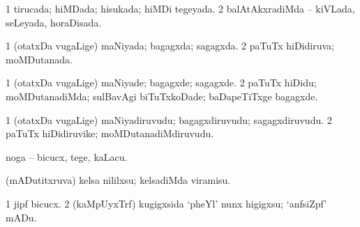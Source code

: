 {{\bentry
{} 
\gl{\gu}
\expl{}
\bmng
\bnum
\num{1} tirucada; hiMDada; hisukada; hiMDi tegeyada. 
\num{2} balAtAkxradiMda -- kiVLada, seLeyada, horaDisada. 
\enum
\emng
\eentry

\bentry
{} 
\gl{\gu}
\expl{}
\bmng
\bnum
\num{1} (otatxDa \mo vugaLige) maNiyada; bagagxda; sagagxda. 
\num{2} paTuTx hiDidiruva; moMDutanada. 
\enum
\emng
\eentry

\bentry
{} 
\gl{\kirxvi}
\expl{}
\bmng
\bnum
\num{1} (otatxDa \mo vugaLige) maNiyade; bagagxde; sagagxde. 
\num{2} paTuTx hiDidu; moMDutanadiMda; sulBavAgi biTuTxkoDade; baDapeTiTxge bagagxde. 
\enum
\emng
\eentry

\bentry
{} 
\gl{\nA}
\expl{}
\bmng
\bnum
\num{1} (otatxDa \mo vugaLige) maNiyadiruvudu; bagagxdiruvudu; sagagxdiruvudu. 
\num{2} paTuTx hiDidiruvike; moMDutanadiMdiruvudu. 
\enum
\emng
\eentry

\bentry
{} 
\gl{\sakirx}
\expl{}
\bmng
noga -- bicucx, tege, kaLacu. 
\emng

\noindent
\gl{\akirx}
\expl{}
\bmng
(mADutitxruva) kelsa nililxsu; kelsadiMda viramisu. 
\emng
\eentry

\bentry
{} 
\gl{\sakirx}
\bmng
\bnum
\num{1} jipf bicucx. 
\num{2} (kaMpUyxTrf) kugigxsida `pheYl' nunx higigxsu; `anfsiZpf' mADu. 
\enum
\emng
\eentry

}}

